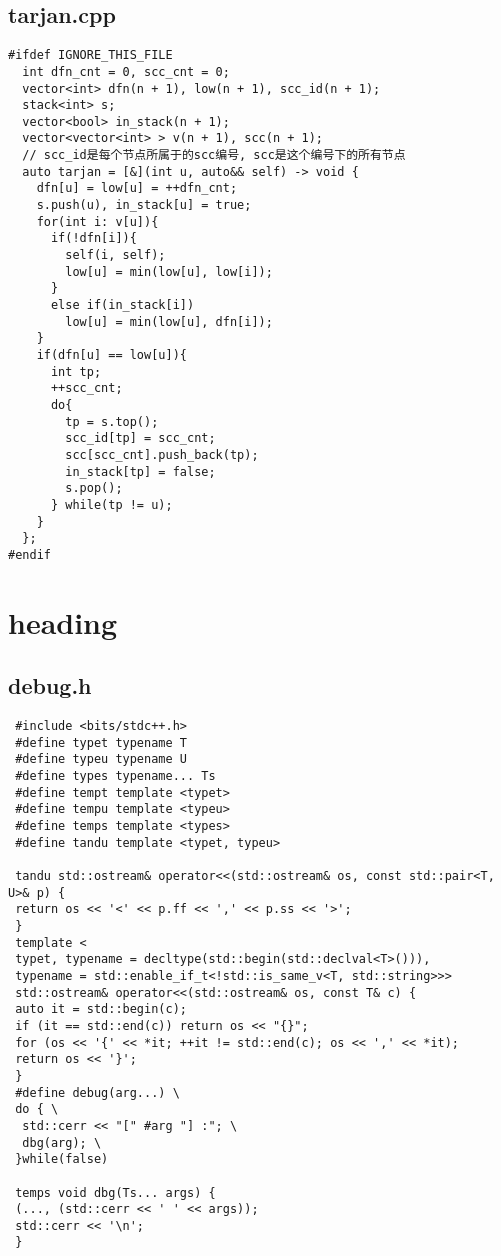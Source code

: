 \documentclass[UTF8, a4paper, titlepage, twoside]{ctexart}
\begin{document}
\subsection{tarjan.cpp}
\begin{verbatim}
#ifdef IGNORE_THIS_FILE
  int dfn_cnt = 0, scc_cnt = 0;
  vector<int> dfn(n + 1), low(n + 1), scc_id(n + 1); 
  stack<int> s;
  vector<bool> in_stack(n + 1);
  vector<vector<int> > v(n + 1), scc(n + 1);
  // scc_id是每个节点所属于的scc编号, scc是这个编号下的所有节点
  auto tarjan = [&](int u, auto&& self) -> void {
    dfn[u] = low[u] = ++dfn_cnt;
    s.push(u), in_stack[u] = true;
    for(int i: v[u]){
      if(!dfn[i]){
        self(i, self);
        low[u] = min(low[u], low[i]);
      }
      else if(in_stack[i])
        low[u] = min(low[u], dfn[i]);
    }
    if(dfn[u] == low[u]){
      int tp;
      ++scc_cnt;
      do{
        tp = s.top();
        scc_id[tp] = scc_cnt;
        scc[scc_cnt].push_back(tp);
        in_stack[tp] = false;
        s.pop();
      } while(tp != u);
    }
  };
#endif
\end{verbatim}

\clearpage
\section{heading}
\subsection{debug.h}
\begin{verbatim}
 #include <bits/stdc++.h>
 #define typet typename T
 #define typeu typename U
 #define types typename... Ts
 #define tempt template <typet>
 #define tempu template <typeu>
 #define temps template <types>
 #define tandu template <typet, typeu>

 tandu std::ostream& operator<<(std::ostream& os, const std::pair<T, U>& p) {
 return os << '<' << p.ff << ',' << p.ss << '>';
 } 
 template <
 typet, typename = decltype(std::begin(std::declval<T>())),
 typename = std::enable_if_t<!std::is_same_v<T, std::string>>>
 std::ostream& operator<<(std::ostream& os, const T& c) {
 auto it = std::begin(c);
 if (it == std::end(c)) return os << "{}";
 for (os << '{' << *it; ++it != std::end(c); os << ',' << *it);
 return os << '}';
 }
 #define debug(arg...) \
 do { \
  std::cerr << "[" #arg "] :"; \
  dbg(arg); \
 }while(false)

 temps void dbg(Ts... args) {
 (..., (std::cerr << ' ' << args));
 std::cerr << '\n';
 }

\end{verbatim}
\end{document}
